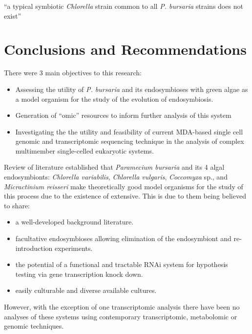 \graphicspath{{chapters/7.Discussion/figures}}

\begin{savequote}[75mm]
    ``a typical symbiotic \textit{Chlorella} strain common to all \textit{P. bursaria}
    strains does not exist''
\end{savequote}

\chapter{Conclusions and Recommendations}

There were 3 main objectives to this research:
\begin{itemize}
    \item Assessing the utility
of \textit{P. bursaria} and its endosymbioses with green algae
as a model organism for the study of the evolution of endosymbiosis.
    \item Generation of ``omic'' resources to inform further analysis of this system
    \item Investigating the the utility and feasibility 
            of current MDA-based
            single cell genomic and transcriptomic sequencing technique in the 
            analysis of complex multimember single-celled eukaryotic systems.
\end{itemize}


Review of literature established that \textit{Paramecium bursaria} and its
4 algal endosymbionts: \textit{Chlorella variabilis}, \textit{Chlorella vulgaris},
\textit{Coccomyxa} sp., 
and \textit{Micractinium reisseri} make theoretically good model
organisms for the study of this process due to the existence
of extensive.   This is due to them being believed to share:
\begin{itemize}
    \item a well-developed background literature.
    \item facultative endosymbioses allowing elimination of the endosymbiont
        and re-introduction experiments.
    \item the potential of a functional and tractable RNAi system for hypothesis
        testing via gene transcription knock down.
    \item easily culturable and diverse available cultures.
\end{itemize}
However, with the exception of one transcriptomic analysis \citep{Kodama2014} 
there have been no analyses of these systems using 
contemporary transcriptomic, metabolomic or genomic techniques. 


